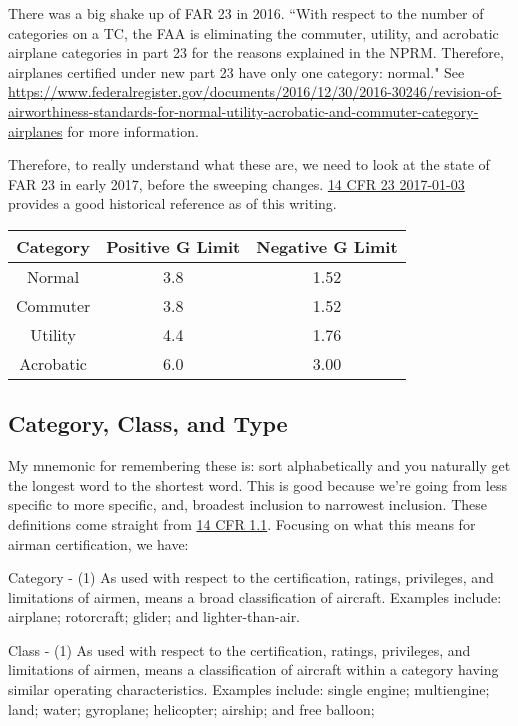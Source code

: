 There was a big shake up of FAR 23 in 2016. ``With respect to the number of categories on a TC, the FAA is eliminating the commuter, utility, and acrobatic airplane categories in part 23 for the reasons explained in the NPRM. Therefore, airplanes certified under new part 23 have only one category: normal." See \url{https://www.federalregister.gov/documents/2016/12/30/2016-30246/revision-of-airworthiness-standards-for-normal-utility-acrobatic-and-commuter-category-airplanes} for more information.

Therefore, to really understand what these are, we need to look at the state of FAR 23 in early 2017, before the sweeping changes. \href{https://www.ecfr.gov/on/2017-01-03/title-14/chapter-I/subchapter-C/part-23}{14 CFR 23 2017-01-03} provides a good historical reference as of this writing.

\begin{center}
\begin{tabular}{ |c|c|c| }
\hline
Category & Positive G Limit & Negative G Limit \\
\hline
Normal    & 3.8 & 1.52 \\
Commuter  & 3.8 & 1.52 \\
Utility   & 4.4 & 1.76 \\
Acrobatic & 6.0 & 3.00 \\
\hline
\end{tabular}
\end{center}

\subsection{Category, Class, and Type}

My mnemonic for remembering these is: sort alphabetically and you naturally get the longest word to the shortest word. This is good because we're going from less specific to more specific, and, broadest inclusion to narrowest inclusion. These definitions come straight from \href{https://www.ecfr.gov/current/title-14/chapter-I/subchapter-A/part-1/section-1.1}{14 CFR 1.1}. Focusing on what this means for airman certification, we have:

Category - (1) As used with respect to the certification, ratings, privileges, and limitations of airmen, means a broad classification of aircraft. Examples include: airplane; rotorcraft; glider; and lighter-than-air.

Class - (1) As used with respect to the certification, ratings, privileges, and limitations of airmen, means a classification of aircraft within a category having similar operating characteristics. Examples include: single engine; multiengine; land; water; gyroplane; helicopter; airship; and free balloon; 

